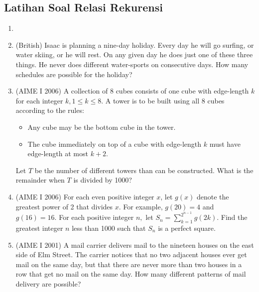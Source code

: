 \subsection{Latihan Soal Relasi Rekurensi}
\begin{enumerate}
    \item \item (British) Isaac is planning a nine-day holiday. Every day he will go surfing, or water skiing, or he will rest. On any given day he does just one of these three things. He never does different water-sports on consecutive days. How many schedules are possible for the holiday?

\item (AIME I 2006) A collection of 8 cubes consists of one cube with edge-length $k$ for each integer $k, 1 \le k \le 8.$ A tower is to be built using all 8 cubes according to the rules:
\begin{itemize}
    \item Any cube may be the bottom cube in the tower.
    \item The cube immediately on top of a cube with edge-length $k$ must have edge-length at most $k+2.$
\end{itemize}
Let $T$ be the number of different towers than can be constructed. What is the remainder when $T$ is divided by 1000?

\item (AIME I 2006) For each even positive integer $x$, let $g(x)$ denote the greatest power of 2 that divides $x.$ For example, $g(20)=4$ and $g(16)=16.$ For each positive integer $n,$ let $S_n=\sum_{k=1}^{2^{n-1}}g(2k).$ Find the greatest integer $n$ less than 1000 such that $S_n$ is a perfect square.

\item (AIME I 2001) A mail carrier delivers mail to the nineteen houses on the east side of Elm Street. The carrier notices that no two adjacent houses ever get mail on the same day, but that there are never more than two houses in a row that get no mail on the same day. How many different patterns of mail delivery are possible?
\end{enumerate}